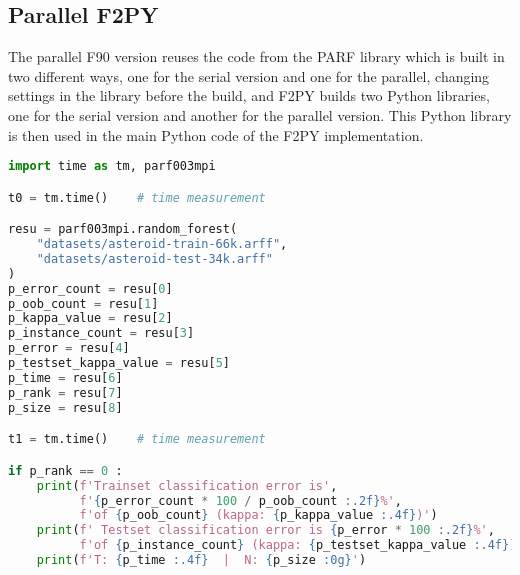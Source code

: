 \subsection{Parallel F2PY}

The parallel F90 version reuses the code from the PARF library which is built in two different ways, one for the serial version and one for the parallel, changing settings in the library before the build, and F2PY builds two Python libraries, one for the serial version and another for the parallel version. This Python library is then used in the main Python code of the F2PY implementation.

\begin{lstlisting}[language=Python, caption={Parallel F2PY implementation of the RF test case - Python main code.}]
import time as tm, parf003mpi

t0 = tm.time()    # time measurement

resu = parf003mpi.random_forest(
    "datasets/asteroid-train-66k.arff",
    "datasets/asteroid-test-34k.arff"
)
p_error_count = resu[0]
p_oob_count = resu[1]
p_kappa_value = resu[2]
p_instance_count = resu[3]
p_error = resu[4]
p_testset_kappa_value = resu[5]
p_time = resu[6]
p_rank = resu[7]
p_size = resu[8]

t1 = tm.time()    # time measurement

if p_rank == 0 :
    print(f'Trainset classification error is',
          f'{p_error_count * 100 / p_oob_count :.2f}%',
          f'of {p_oob_count} (kappa: {p_kappa_value :.4f})')
    print(f' Testset classification error is {p_error * 100 :.2f}%',
          f'of {p_instance_count} (kappa: {p_testset_kappa_value :.4f})')
    print(f'T: {p_time :.4f}  |  N: {p_size :0g}')
\end{lstlisting}




